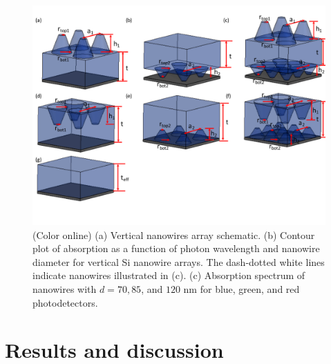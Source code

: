 \documentclass[journal=jacsat,manuscript=article]{achemso}
\begin{document}
\begin{figure}[htb]
  \centering
 \includegraphics[scale=.8]{../Figures/Schematic}
 \vspace{-12pt}
    \caption[Absorption spectra]{(Color online) (a) Vertical nanowires array schematic. 
    (b) Contour plot of absorption as a function of photon wavelength and nanowire diameter for vertical Si nanowire arrays.
    The dash-dotted white lines indicate nanowires illustrated in (c).  (c) Absorption spectrum of nanowires with $d = 70, 85$, and $120$ nm for 
blue, green, and red photodetectors.} 
  \label{fig:AbsorptionContour}
     \vspace{-12pt}
\end{figure}

\section{Results and discussion}


\begin{acknowledgement}

\end{acknowledgement}
\end{document}
